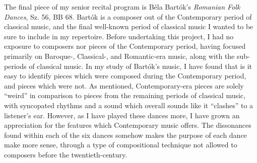 The final piece of my senior recital program is Béla Bartók's \textit{Romanian Folk Dances}, Sz. 56, BB 68. Bartók is a composer out of the Contemporary period of classical music, and the final well-known period of classical music I wanted to be sure to include in my repertoire. Before undertaking this project, I had no exposure to composers nor pieces of the Contemporary period, having focused primarily on Baroque-, Classical-, and Romantic-era music, along with the sub-periods of classical music. In my study of Bartók's music, I have found that is it easy to identify pieces which were composed during the Contemporary period, and pieces which were not. As mentioned, Contemporary-era pieces are solely ``weird'' in comparison to pieces from the remaining periods of classical music, with syncopated rhythms and a sound which overall sounds like it ``clashes'' to a listener's ear. However, as I have played these dances more, I have grown an appreciation for the features which Contemporary music offers. The dissonances found within each of the six dances somehow makes the purpose of each dance make more sense, through a type of compositional technique not allowed to composers before the twentieth-century. 